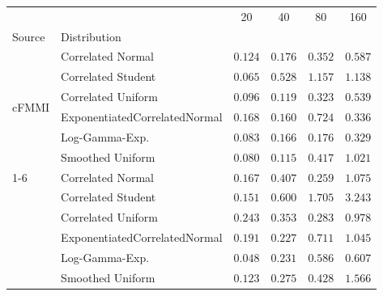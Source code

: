 \begin{tabular}{llcccc}
\toprule
 &  & 20 & 40 & 80 & 160 \\
Source & Distribution &  &  &  &  \\
\midrule
\multirow[l]{6}{*}{cFMMI} & Correlated Normal & $ 0.124 $ & $ 0.176 $ & $ 0.352 $ & $ 0.587 $ \\
 & Correlated Student & $ 0.065 $ & $ 0.528 $ & $ 1.157 $ & $ 1.138 $ \\
 & Correlated Uniform & $ 0.096 $ & $ 0.119 $ & $ 0.323 $ & $ 0.539 $ \\
 & ExponentiatedCorrelatedNormal & $ 0.168 $ & $ 0.160 $ & $ 0.724 $ & $ 0.336 $ \\
 & Log-Gamma-Exp. & $ 0.083 $ & $ 0.166 $ & $ 0.176 $ & $ 0.329 $ \\
 & Smoothed Uniform & $ 0.080 $ & $ 0.115 $ & $ 0.417 $ & $ 1.021 $ \\
\cmidrule{1-6}
\multirow[l]{6}{*}{jFMMI} & Correlated Normal & $ 0.167 $ & $ 0.407 $ & $ 0.259 $ & $ 1.075 $ \\
 & Correlated Student & $ 0.151 $ & $ 0.600 $ & $ 1.705 $ & $ 3.243 $ \\
 & Correlated Uniform & $ 0.243 $ & $ 0.353 $ & $ 0.283 $ & $ 0.978 $ \\
 & ExponentiatedCorrelatedNormal & $ 0.191 $ & $ 0.227 $ & $ 0.711 $ & $ 1.045 $ \\
 & Log-Gamma-Exp. & $ 0.048 $ & $ 0.231 $ & $ 0.586 $ & $ 0.607 $ \\
 & Smoothed Uniform & $ 0.123 $ & $ 0.275 $ & $ 0.428 $ & $ 1.566 $ \\
\bottomrule
\end{tabular}
